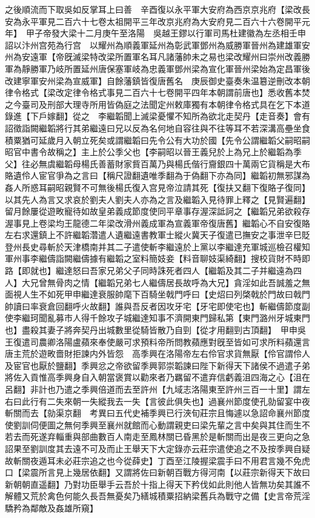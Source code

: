 之後順流而下取吳如反掌耳上曰善　辛酉復以永平軍大安府為西京京兆府【梁改長安為永平軍見二百六十七卷太祖開平三年改京兆府為大安府見二百六十六卷開平元年】　甲子帝發大梁十二月庚午至洛陽　吳越王鏐以行軍司馬杜建徽為左丞相壬申詔以汴州宫苑為行宫　以耀州為順義軍延州為彰武軍鄧州為威勝軍晉州為建雄軍安州為安遠軍【帝旣滅梁特改梁所置軍名耳凡諸藩帥未之易也梁改耀州曰崇州改義勝軍為靜勝軍乃岐所置延州唐保塞軍岐為忠義軍鄧州梁為宣化軍晉州梁始為定昌軍後改建寧軍安州梁為宣威軍】自餘藩鎮皆復唐舊名　庚辰御史臺奏朱温簒逆刪改本朝律令格式【梁改定律令格式事見二百六十七卷開平四年本朝謂前唐也】悉收舊本焚之今臺司及刑部大理寺所用皆偽庭之法聞定州敕庫獨有本朝律令格式具在乞下本道錄進【下戶嫁翻】從之　李繼韜聞上滅梁憂懼不知所為欲北走契丹【走音奏】會有詔徵詣闕繼韜將行其弟繼遠曰兄以反為名何地自容往與不往等耳不若深溝高壘坐食積粟猶可延歲月入朝立死矣或謂繼韜曰先令公有大功於國【先令公謂繼韜父嗣昭嗣昭官中書令故稱之】主上於公季父也【李嗣昭以晉王義兒於上為兄上於繼韜為季父】往必無虞繼韜母楊氏善蓄財家貲百萬乃與楊氏偕行齎銀四十萬兩它貨稱是大布賂遺伶人宦官爭為之言曰【稱尺證翻遺唯季翻為于偽翻下亦為同】繼韜初無邪謀為姦人所惑耳嗣昭親賢不可無後楊氏復入宫見帝泣請其死【復扶又翻下復賂子復同】以其先人為言又求哀於劉夫人劉夫人亦為之言及繼韜入見待罪上釋之【見賢遍翻】留月餘屢從遊畋寵待如故皇弟義成節度使同平章事存渥深詆訶之【繼韜兄弟欲殺存渥事見上卷梁均王龍德二年梁改滑州義成軍為宣義軍帝復唐舊】繼韜心不自安復賂左右求還鎮上不許繼韜濳遣人遺繼遠書教軍士縱火冀天子復遣已撫安之事泄辛巳貶登州長史尋斬於天津橋南并其二子遣使斬李繼遠於上黨以李繼達充軍城巡檢召權知軍州事李繼儔詣闕繼儔據有繼韜之室料簡妓妾【料音聊妓渠綺翻】搜校貨財不時即路【即就也】繼達怒曰吾家兄弟父子同時誅死者四人【繼韜及其二子并繼遠為四人】大兄曾無骨肉之情【繼韜兄弟七人繼儔居長故呼為大兄】貪淫如此吾誠羞之無面視人生不如死甲申繼達衰服帥麾下百騎坐戟門呼曰【史炤曰列棨戟於門故曰戟門帥讀曰率衰倉回翻呼火故翻】誰與吾反者因攻牙宅【牙宅即使宅也】斬繼儔節度副使李繼珂聞亂募市人得千餘攻子城繼達知事不濟開東門歸私第【東門潞州牙城東門也】盡殺其妻子將奔契丹出城數里從騎皆散乃自剄【從才用翻剄古頂翻】　甲申吳王復遣司農卿洛陽盧蘋來奉使嚴可求預料帝所問教蘋應對旣至皆如可求所料蘋還言唐主荒於遊畋嗇財拒諫内外皆怨　高季興在洛陽帝左右伶官求貨無厭【伶官謂伶人及宦官也厭於鹽翻】季興忿之帝欲留季興郭崇韜諫曰陛下新得天下諸侯不過遣子弟將佐入貢惟高季興身自入朝當褒賞以勸來者乃羈留不遣弃信虧義沮四海之心【沮在呂翻】非計也乃遣之季興倍道而去至許州【九域志洛陽東至許州三百一十里】謂左右曰此行有二失來朝一失縱我去一失【言彼此俱失也】過襄州節度使孔勍留宴中夜斬關而去【勍渠京翻　考異曰五代史補季興已行浹旬莊宗且悔遽以急詔命襄州節度使劉訓伺便圖之無何季興至襄州就館而心動謂親吏曰梁先輩之言中矣與其住而生不若去而死遂弃輜重與部曲數百人南走至鳳林關已昏黑於是斬關而出是夜三更向之急詔果至劉訓度其去遠不可及而止王舉天下大定錄亦云莊宗遣使追之不及按季興自疑故斬關夜遁耳未必莊宗追之也今從薛史】丁酉至江陵握梁震手曰不用君言幾不免虎口【梁震所言見上幾居依翻】又謂將佐曰新朝百戰方得河南【以莊宗新得天下故曰新朝朝直遥翻】乃對功臣舉手云吾於十指上得天下矜伐如此則他人皆無功矣其誰不解體又荒於禽色何能久長吾無憂矣乃繕城積粟招納梁舊兵為戰守之備【史言帝荒淫驕矜為鄰敵及姦雄所窺】


